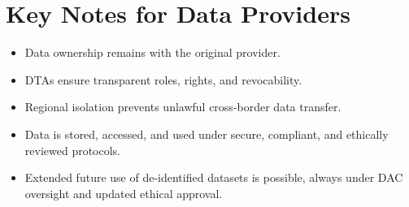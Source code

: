 \documentclass{article}
\begin{document}
\section*{Key Notes for Data Providers}
\begin{itemize}
    \item Data ownership remains with the original provider.
    \item DTAs ensure transparent roles, rights, and revocability.
    \item Regional isolation prevents unlawful cross-border data transfer.
    \item Data is stored, accessed, and used under secure, compliant, and ethically reviewed protocols.
    \item Extended future use of de-identified datasets is possible, always under DAC oversight and updated ethical approval.
\end{itemize}
\end{document}
